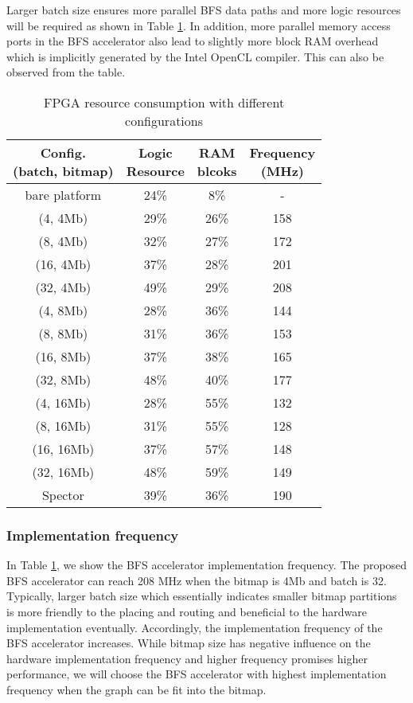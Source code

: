 Larger batch size ensures more parallel BFS data paths and 
more logic resources will be required as shown in 
Table \ref{tab:resource}. In addition, more 
parallel memory access ports in the BFS accelerator also lead to 
slightly more block RAM overhead which is implicitly generated by the Intel 
OpenCL compiler. This can also be observed from the table.

\begin{table}
  \caption{FPGA resource consumption with different configurations}
  \label{tab:resource}
    \centering
  \begin{tabular}{cccc}
    \toprule
	\shortstack{Config. \\ (batch, bitmap)} & \shortstack{Logic \\ Resource} & \shortstack{RAM \\ blcoks} & \shortstack{Frequency \\ (MHz)} \\
	\midrule
	  bare platform   & 24\% & 8\%  & -   \\
	  \midrule
	  (4, 4Mb)   & 29\% & 26\% & 158 \\
	  (8, 4Mb)   & 32\% & 27\% & 172 \\
	  (16, 4Mb)  & 37\% & 28\% & 201 \\
	  (32, 4Mb)  & 49\% & 29\% & 208 \\
	  \midrule
	  (4, 8Mb)  & 28\% & 36\% & 144 \\
	  (8, 8Mb)  & 31\% & 36\% & 153 \\
	  (16, 8Mb) & 37\% & 38\% & 165 \\
	  (32, 8Mb) & 48\% & 40\% & 177 \\
	  \midrule
	  (4, 16Mb)  & 28\% & 55\% & 132 \\
	  (8, 16Mb)  & 31\% & 55\% & 128 \\
	  (16, 16Mb) & 37\% & 57\% & 148 \\
	  (32, 16Mb) & 48\% & 59\% & 149 \\
	  \midrule
      Spector    & 39\% & 36\% & 190 \\
  \bottomrule
\end{tabular}
\vspace{-1em}
\end{table}

\subsubsection{Implementation frequency}
In Table \ref{tab:resource}, we show the BFS accelerator implementation frequency.
The proposed BFS accelerator can reach 208 MHz when the bitmap is 4Mb and batch is 32.
Typically, larger batch size which essentially indicates smaller bitmap partitions
is more friendly to the placing and routing and beneficial to the hardware implementation 
eventually. Accordingly, the implementation frequency of the BFS accelerator increases. 
While bitmap size has negative influence on the hardware implementation frequency
and higher frequency promises higher performance, we will choose the BFS 
accelerator with highest implementation frequency when the graph can be fit into 
the bitmap.

